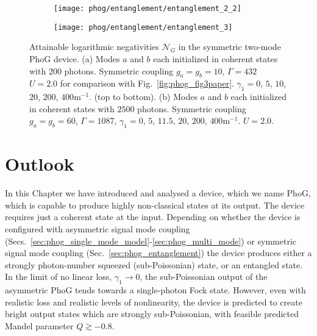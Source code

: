 
\begin{figure}[htp]
\captionsetup{width=\linewidth}
\centering
	\begin{subfigure}{0.7\linewidth}
	\centering
	\caption{}
	\texttt{[image: phog/entanglement/entanglement\_2\_2]}
	\end{subfigure}
	\begin{subfigure}{0.7\linewidth}
	\centering
	\caption{}
	\texttt{[image: phog/entanglement/entanglement\_3]}
	\end{subfigure}
	\caption{\label{fig:phog_negativities} Attainable logarithmic negativities $\mathcal{N}_G$ in the symmetric two-mode PhoG device. (a) Modes $a$ and $b$ each initialized in coherent states with $200$ photons. Symmetric coupling $g_a = g_b = 10$, $\Gamma=432$ $U=2.0$ for comparison with Fig.~\ref{fig:phog_fig3paper}. $\gamma_1 = 0$, $5$, $10$, $20$, $200$, $400$m$^{-1}$. (top to bottom). (b) Modes $a$ and $b$ each initialized in coherent states with $2500$ photons. Symmetric coupling $g_a = g_b = 60$, $\Gamma = 1087$, $\gamma_1 = 0$, $5$, $11.5$, $20$, $200$, $400$m$^{-1}$. $U = 2.0$.}
\end{figure}

\FloatBarrier
\section{Outlook}\label{sec:phog_outlook}
In this Chapter we have introduced and analysed a device, which we name PhoG, which is capable to produce highly non-classical states at its output. The device requires just a coherent state at the input. Depending on whether the device is configured with asymmetric signal mode coupling (Secs.~\ref{sec:phog_single_mode_model}-\ref{sec:phog_multi_mode}) or symmetric signal mode coupling (Sec.~\ref{sec:phog_entanglement}) the device produces either a strongly photon-number squeezed (sub-Poissonian) state, or an entangled state. In the limit of no linear loss, $\gamma_1 \rightarrow 0$, the sub-Poissonian output of the asymmetric PhoG tends towards a single-photon Fock state. However, even with realistic loss and realistic levels of nonlinearity, the device is predicted to create bright output states which are strongly sub-Poissonian, with feasible predicted Mandel parameter $Q \gtrsim -0.8$.

